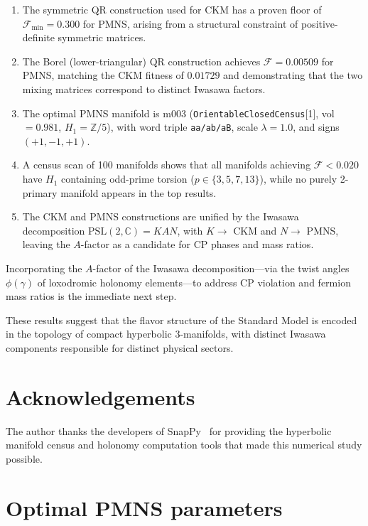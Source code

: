 \documentclass[11pt,a4paper]{article}
\newcommand{\PSL}{\mathrm{PSL}(2,\mathbb{C})}
\begin{document}
\begin{enumerate}
\item The symmetric QR construction used for CKM has a proven
floor of $\mathcal{F}_{\min} = 0.300$ for PMNS, arising from a
structural constraint of positive-definite symmetric matrices.

\item The Borel (lower-triangular) QR construction achieves
$\mathcal{F} = 0.00509$ for PMNS, matching the CKM fitness of
$0.01729$ and demonstrating that the two mixing matrices
correspond to distinct Iwasawa factors.

\item The optimal PMNS manifold is m003
(\texttt{OrientableClosedCensus}[1], vol $= 0.981$,
$H_1 = \mathbb{Z}/5$), with word triple \texttt{aa/ab/aB},
scale $\lambda = 1.0$, and signs $(+1, -1, +1)$.

\item A census scan of 100 manifolds shows that all manifolds
achieving $\mathcal{F} < 0.020$ have $H_1$ containing odd-prime
torsion ($p \in \{3, 5, 7, 13\}$), while no purely 2-primary manifold
appears in the top results.

\item The CKM and PMNS constructions are unified by the Iwasawa
decomposition $\PSL = KAN$, with $K \to$ CKM and $N \to$ PMNS,
leaving the $A$-factor as a candidate for CP phases and mass ratios.
\end{enumerate}

Incorporating the $A$-factor of the Iwasawa decomposition---via
the twist angles $\phi(\gamma)$ of loxodromic holonomy elements---to
address CP violation and fermion mass ratios is the immediate next step.

These results suggest that the flavor structure of the Standard Model
is encoded in the topology of compact hyperbolic 3-manifolds, with distinct Iwasawa components responsible for distinct physical sectors.

\section*{Acknowledgements}
The author thanks the developers of SnapPy~\cite{snappy} for
providing the hyperbolic manifold census and holonomy computation
tools that made this numerical study possible.


\appendix

\section{Optimal PMNS parameters}
\label{app:params}
\end{document}
